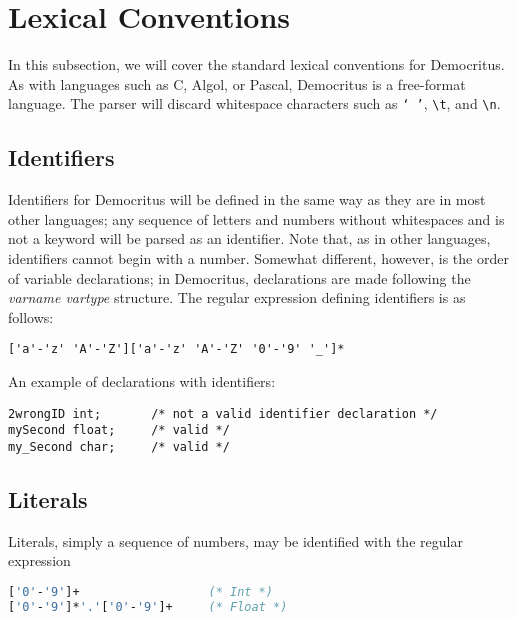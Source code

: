 \section{Lexical Conventions}
	In this subsection, we will cover the standard lexical conventions for Democritus. As with languages such as C, Algol, or Pascal, Democritus is a free-format language. The parser will discard whitespace characters such as \texttt{` '}, \texttt{\textbackslash t}, and \texttt{\textbackslash n}.
	
	\subsection{Identifiers}
		Identifiers for Democritus will be defined in the same way as they are in most other languages; any sequence of letters and numbers without whitespaces and is not a keyword will be parsed as an identifier. Note that, as in other languages, identifiers cannot begin with a number. Somewhat different, however, is the order of variable declarations; in Democritus, declarations are made following the \textit{varname vartype} structure. The regular expression defining identifiers is as follows:
		
	\begin{lstlisting}
['a'-'z' 'A'-'Z']['a'-'z' 'A'-'Z' '0'-'9' '_']*
	\end{lstlisting}
	
	\noindent An example of declarations with identifiers: 
	
	\begin{lstlisting}
2wrongID int;		/* not a valid identifier declaration */
mySecond float;		/* valid */
my_Second char;		/* valid */
	\end{lstlisting}
	
	\subsection{Literals}
		Literals, simply a sequence of numbers, may be identified with the regular expression
	\begin{lstlisting}[language=Caml]
['0'-'9']+ 					(* Int *)
['0'-'9']*'.'['0'-'9']+  	(* Float *)
	\end{lstlisting}
	
